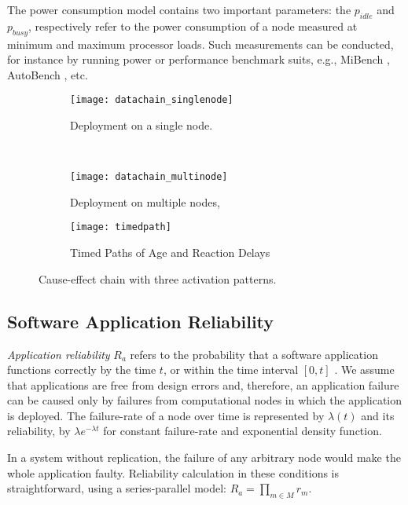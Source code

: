 The power consumption model contains two important parameters: the $p_{idle}$ and $p_{busy}$, respectively refer to the power consumption of a node measured at minimum and maximum processor loads. Such measurements can be conducted, for instance by running power or performance benchmark suits, e.g., MiBench \cite{Guthaus2001MiBench:Suite}, AutoBench \cite{EMBC2018AutoBenchProcessors}, etc.
\begin{figure*}[h!]
    \centering
    \begin{subfigure}[b]{0.25\textwidth}
    \texttt{[image: datachain\_singlenode]}
    \caption{Deployment on a single node.}
    \label{fig_datachainsingle}
    \end{subfigure}
    ~ %
    \begin{subfigure}[b]{0.35\textwidth}
    \texttt{[image: datachain\_multinode]}
    \caption{Deployment on multiple nodes,}
    \label{fig_datachainmulti}
    \end{subfigure}
   \hfill
    \begin{subfigure}[b]{0.375\textwidth}
    \texttt{[image: timedpath]}
    \caption{Timed Paths of Age and Reaction Delays}
    \label{fig_timedpath}
    \end{subfigure}
    \caption{Cause-effect chain with three activation patterns.}
    \label{fig:datachain}
\end{figure*}

\subsection{Software Application Reliability}
\textit{Application reliability} $R_a$ refers to the probability that a software application functions correctly by the time $t$, or within the time interval $[0, t]$ \cite{Goel1985SoftwareApplicability}. We assume that  applications are free from design errors and, therefore, an application failure can be caused only by failures from computational nodes in which the application is deployed. The failure-rate of a node over time is represented by $\lambda(t)$ and its reliability, by $\lambda e^{-\lambda t}$ for constant failure-rate and exponential density function. 

In a system without replication, the failure of any arbitrary node would make the whole application faulty. Reliability calculation in these conditions is straightforward, using a series-parallel model: $R_a = \prod_{m\in M}r_m$.

